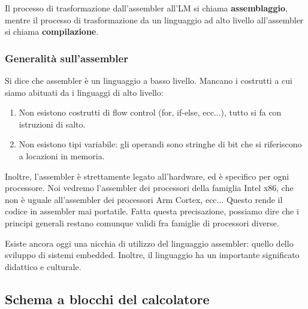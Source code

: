 \documentclass[a4paper,11pt]{article}
\begin{document}
Il processo di trasformazione dall'assembler all'LM si chiama \textbf{assemblaggio}, mentre il processo di trasformazione da un linguaggio ad alto livello all'assembler si chiama \textbf{compilazione}.

\subsubsection{Generalità sull'assembler}
Si dice che assembler è un linguaggio a basso livello.
Mancano i costrutti a cui siamo abituati da i linguaggi di alto livello:
\begin{enumerate}
	\item Non esistono costrutti di flow control (for, if-else, ecc...), tutto si fa con istruzioni di salto.
	\item Non esistono tipi variabile: gli operandi sono stringhe di bit che si riferiscono a locazioni in memoria.
\end{enumerate}

Inoltre, l'assembler è strettamente legato all'hardware, ed è specifico per ogni processore.
Noi vedremo l'assembler dei processori della famiglia Intel x86, che non è uguale all'assembler dei processori Arm Cortex, ecc...
Questo rende il codice in assembler mai portatile.
Fatta questa precisazione, possiamo dire che i principi generali restano comunque validi fra famiglie di processori diverse.

Esiste ancora oggi una nicchia di utilizzo del linguaggio assembler: quello dello sviluppo di sistemi embedded.
Inoltre, il linguaggio ha un importante significato didattico e culturale.

\subsection{Schema a blocchi del calcolatore}
\end{document}
